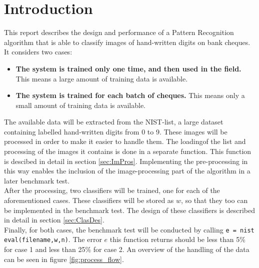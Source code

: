  \section{Introduction}
  \label{Intro}
  This report describes the design and performance of a Pattern Recognition algorithm that is able to classify images of hand-written digits on bank cheques. It considers two cases:
  \begin{itemize}
  	\item \textbf{The system is trained only one time, and then used in the field.} This means a large amount of training data is available.
  	\item \textbf{The system is trained for each batch of cheques.} This means only a small amount of training data is available.
  \end{itemize}
The available data will be extracted from the NIST-list, a large dataset containing labelled hand-written digits from 0 to 9. These images will be processed in order to make it easier to handle them. The loadingof the list and processing of the images it contains is done in a separate function.  This function is descibed in detail in section \ref{sec:ImPros}. Implementing the pre-processing in this way enables the inclusion of the image-processing part of the algorithm in a later benchmark test. \\
\indent After the processing, two classifiers will be trained, one for each of the aforementioned cases. These classifiers will be stored as $w$, so that they too can be implemented in the benchmark test. The design of these classifiers is described in detail in section \ref{sec:ClasDes}. \\
\indent Finally, for both cases, the benchmark test will be conducted by calling \texttt{e = nist eval(filename,w,n)}. The error $e$ this function returns should be less than 5\% for case 1 and less than 25\% for case 2. An overview of the handling of the data can be seen in figure \ref{fig:process_flow}.
